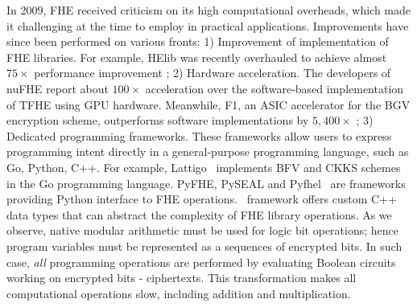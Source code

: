 

In 2009, FHE received criticism on its high computational overheads, which made it challenging at the time to employ in practical applications. Improvements have since been performed on various fronts: 1) Improvement of implementation of FHE libraries. For example, HElib was recently overhauled to achieve almost $75 \times$ performance improvement \cite{cryptoeprint:2018:244}; 2) Hardware acceleration. The developers of nuFHE \cite{nuFHE} report about $100 \times$ acceleration over the software-based implementation of TFHE using GPU hardware. Meanwhile, F1, an ASIC accelerator for the BGV encryption scheme, outperforms software implementations by $5,400 \times$ \cite{f1}; 3) Dedicated programming frameworks. These frameworks allow users to express programming intent directly in a general-purpose programming language, such as Go, Python, C++.
For example, Lattigo~\cite{lattigop} implements  BFV and CKKS schemes in the Go programming language.
PyFHE, PySEAL and Pyfhel~\cite{pyfhel} are frameworks providing Python interface to FHE operations.
\eee\ framework \cite{e3eprint} offers custom C++ data types that can abstract the complexity of FHE library operations. As we observe, native modular arithmetic must be used for logic bit operations; hence program variables must be represented as a sequences of encrypted bits. In such case, \textit{all} programming operations are performed by evaluating Boolean circuits working on encrypted bits - ciphertexts. This transformation makes all computational operations slow, including addition and multiplication.

